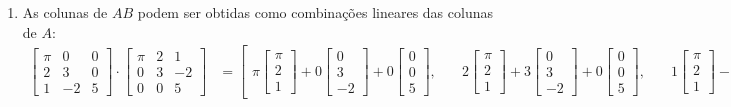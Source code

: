 \documentclass[12pt,a4paper]{article}
\begin{document}
\begin{enumerate}
\begin{enumerate}
\item As colunas de $AB$ podem ser obtidas como combinações lineares das colunas de $A$:
\begin{align*}
\begin{bmatrix}
\pi & 0 & 0 \\
  2 & 3 & 0 \\
  1 & -2 & 5
\end{bmatrix}
\cdot
\begin{bmatrix}
\pi & 2 & 1 \\
 0 & 3 & -2 \\
 0 & 0 & 5
\end{bmatrix}
& =
\left[\begin{smallmatrix}
\pi
\begin{bmatrix}
\pi \\
  2 \\
  1
\end{bmatrix}
+0
\begin{bmatrix}
0 \\
3 \\
-2
\end{bmatrix}
+0
\begin{bmatrix}
0 \\
0 \\
5
\end{bmatrix},\quad
&
2
\begin{bmatrix}
\pi \\
  2 \\
  1
\end{bmatrix}
+3
\begin{bmatrix}
0 \\
3 \\
-2
\end{bmatrix}
+0
\begin{bmatrix}
0 \\
0 \\
5
\end{bmatrix},\quad
&
1
\begin{bmatrix}
\pi \\
  2 \\
  1
\end{bmatrix}
-2
\begin{bmatrix}
0 \\
3 \\
-2
\end{bmatrix}
+5
\begin{bmatrix}
0 \\
0 \\
5
\end{bmatrix}

\end{smallmatrix}
\end{align*}
\end{enumerate}
\end{enumerate}
\end{document}

